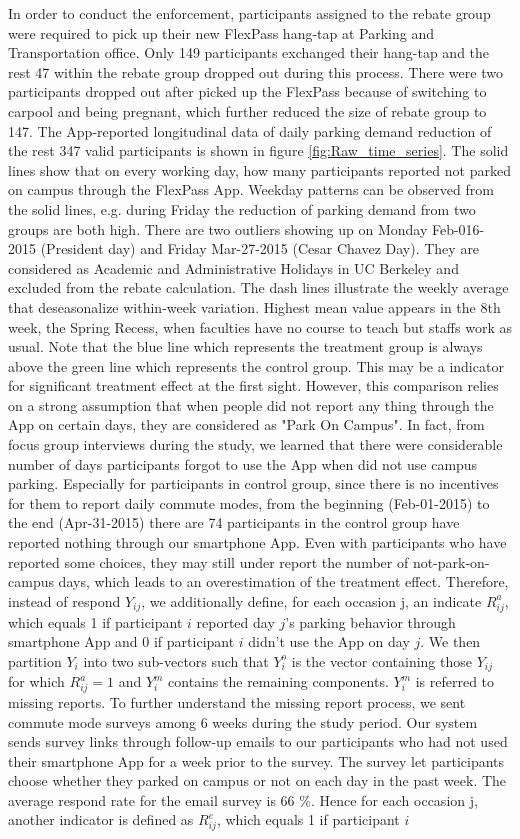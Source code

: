 \documentclass[preprint,12pt]{elsarticle}
\begin{document}
In order to conduct the enforcement, participants assigned to the rebate group were required to pick up their new FlexPass hang-tap at Parking and Transportation office. Only 149 participants exchanged their hang-tap and the rest 47 within the rebate group dropped out during this process. There were two participants dropped out after picked up the FlexPass because of switching to carpool and being pregnant, which further reduced the size of rebate group to 147. The App-reported longitudinal data of daily parking demand reduction of the rest 347 valid participants is shown in figure \ref{fig:Raw_time_series}. The solid lines show that on every working day, how many participants reported not parked on campus through the FlexPass App. Weekday patterns can be observed from the solid lines, e.g. during Friday the reduction of parking demand from two groups are both high. There are two outliers showing up on Monday Feb-016-2015 (President day) and Friday Mar-27-2015 (Cesar Chavez Day). They are considered as Academic and Administrative Holidays in UC Berkeley and excluded from the rebate calculation. The dash lines illustrate the weekly average that deseasonalize within-week variation. Highest mean value appears in the 8th week, the Spring Recess, when faculties have no course to teach but staffs work as usual. Note that the blue line which represents the treatment group is always above the green line which represents the control group. This may be a indicator for significant treatment effect at the first sight. However, this comparison relies on a strong assumption that when people did not report any thing through the App on certain days, they are considered as "Park On Campus". In fact, from focus group interviews during the study, we learned that there were considerable number of days participants forgot to use the App when did not use campus parking. Especially for participants in control group, since there is no incentives for them to report daily commute modes, from the beginning (Feb-01-2015) to the end (Apr-31-2015) there are 74 participants in the control group have reported nothing through our smartphone App. Even with participants who have reported some choices, they may still under report the number of not-park-on-campus days, which leads to an overestimation of the treatment effect. Therefore, instead of respond $Y_{ij}$, we additionally define, for each occasion j, an indicate $R_{ij}^a$, which equals 1 if participant $i$ reported day $j$'s parking behavior through smartphone App and 0 if participant $i$ didn't use the App on day $j$. We then partition $Y_i$ into two sub-vectors such that $Y^o_i$ is the vector containing those $Y_{ij}$ for which $R_{ij}^a=1$ and $Y^m_i$ contains the remaining components. $Y^m_i$ is referred to missing reports. To further understand the missing report process, we sent commute mode surveys among 6 weeks during the study period. Our system sends survey links through follow-up emails to our participants who had not used their smartphone App for a week prior to the survey. The survey let participants choose whether they parked on campus or not on each day in the past week. The average respond rate for the email survey is 66 $\%$. Hence for each occasion j, another indicator is defined as $R_{ij}^e$, which equals 1 if participant $i$ 
\end{document}
